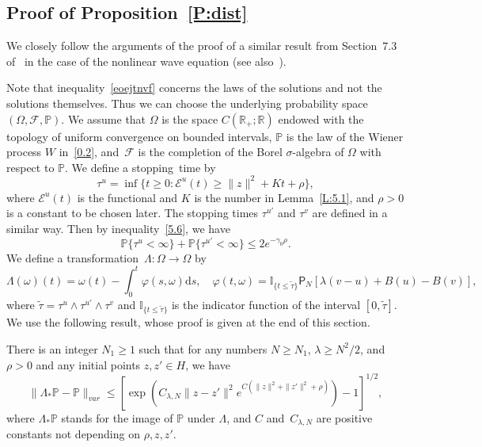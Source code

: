 \documentclass[AHL,Unicode,longabstracts]{cedram}
\newcommand{\ph}{\varphi}
\newcommand{\R}{{\mathbb R}}
\newcommand{\pP}{{\mathbb P}}
\newcommand{\I}{{\mathbb I}}
\newcommand{\EE}{{\mathcal E}}
\newcommand{\FF}{{\mathcal F}}
\newcommand{\la}{\lambda}
\newcommand{\ty}{\infty}
\newcommand{\om}{\omega}
\newcommand{\dd}{\mathrm{d}}
\begin{document}
\subsection{Proof of Proposition~\ref{P:dist}}\label{apascss}



We closely follow the arguments of the proof of a similar result from Section~7.3 of~\cite{MN-2015} in the case of the nonlinear wave equation (see also~\cite[Section~3.3.3]{KS-book}).



Note that inequality~\eqref{eoejtnvf} concerns the laws of the solutions and not the solutions themselves. Thus we can choose the underlying probability space~$(\Omega,\FF,\pP)$. We assume that $\Omega$ is the space $C(\R_+; \R)$ endowed with the topology of uniform convergence on bounded intervals, $\pP$ is the law of the Wiener process $W$ in~\eqref{0.2}, and~$\FF$ is the completion of the Borel $\sigma$-algebra of $\Omega$ with respect to $\pP$. We define a stopping~time by
\[
\tau^u=\inf\{t\geq 0:\EE^u(t)\geq \|z\|^2+Kt+\rho\},
\]
where $\EE^u(t)$ is the functional and $K$ is the number in Lemma~\ref{L:5.1}, and $\rho>0$ is a constant to be chosen later. The stopping times $\tau^{u'}$ and $\tau^v$ are defined in a similar way. Then by inequality~\eqref{5.6}, we have
\begin{equation}\label{estd}
\pP\{\tau^{u}<\ty\}+\pP\{\tau^{u'}<\ty\} \le 2e^{-\gamma_0\rho}.
\end{equation}
We define a transformation~$\Lambda:\Omega\to\Omega$ by
\[
\Lambda(\om)(t)=\om(t)-\int_0^t \ph(s,\omega)\dd s,\quad \ph(t,\omega)=\I_{\{t\le\tilde\tau\}}{\mathsf P}_N[\la(v-u)+B(u)-B(v)],
\]
where $
\tilde\tau=\tau^{u}\wedge\tau^{u'}\wedge\tau^{v} $ and $\I_{\{t\leq\tilde\tau\}}$ is the indicator function of the interval $[0,\tilde\tau]$. We use the following result, whose proof is given at the end of this section.

\begin{lemm}\label{4.21}
There is an integer $N_1\ge1$ such that for any numbers $N\ge N_1$, $\la\ge N^2/2 $, and $\rho>0$ and any initial points $z,z'\in H$, we have
\begin{equation}\label{6.46}
\|\Lambda_*\pP-\pP\|_{ var}\leq \left[\exp\left(C_{\lambda,N}\|z-z'\|^2 e^{ C (\|z\|^2 +\|z'\|^2+\rho)} \right)-1\right]^{1/2},
\end{equation}
where $\Lambda_*\pP$ stands for the image of $\pP$ under $\Lambda$, and $C$ and~$C_{\la,N}$ are positive constants not depending on $\rho, z,z'$.
\end{lemm}
\end{document}
